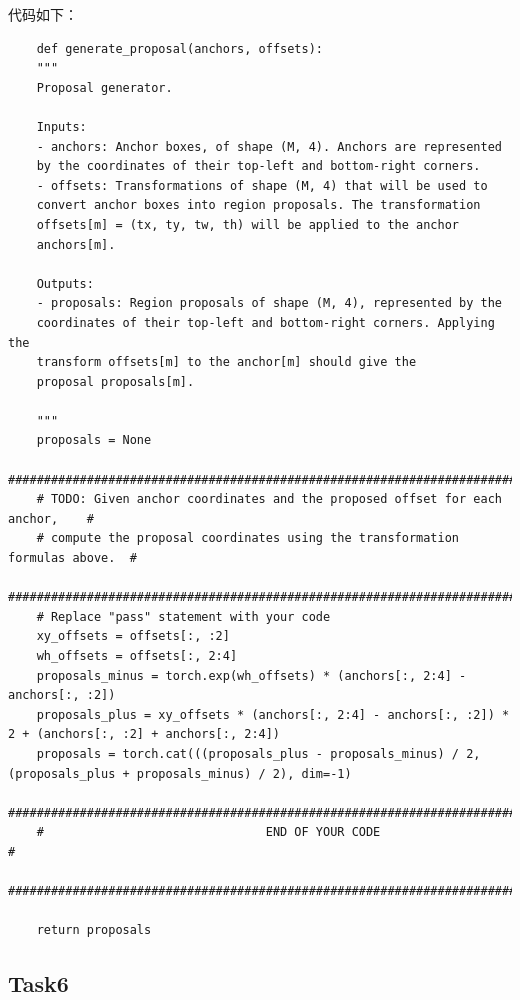 \documentclass{article}%
\begin{document}
代码如下：
\begin{lstlisting}
    def generate_proposal(anchors, offsets):
    """
    Proposal generator.

    Inputs:
    - anchors: Anchor boxes, of shape (M, 4). Anchors are represented
    by the coordinates of their top-left and bottom-right corners.
    - offsets: Transformations of shape (M, 4) that will be used to
    convert anchor boxes into region proposals. The transformation
    offsets[m] = (tx, ty, tw, th) will be applied to the anchor
    anchors[m].

    Outputs:
    - proposals: Region proposals of shape (M, 4), represented by the
    coordinates of their top-left and bottom-right corners. Applying the
    transform offsets[m] to the anchor[m] should give the
    proposal proposals[m].

    """
    proposals = None
    ##############################################################################
    # TODO: Given anchor coordinates and the proposed offset for each anchor,    #
    # compute the proposal coordinates using the transformation formulas above.  #
    ##############################################################################
    # Replace "pass" statement with your code
    xy_offsets = offsets[:, :2]
    wh_offsets = offsets[:, 2:4]
    proposals_minus = torch.exp(wh_offsets) * (anchors[:, 2:4] - anchors[:, :2])
    proposals_plus = xy_offsets * (anchors[:, 2:4] - anchors[:, :2]) * 2 + (anchors[:, :2] + anchors[:, 2:4])
    proposals = torch.cat(((proposals_plus - proposals_minus) / 2, (proposals_plus + proposals_minus) / 2), dim=-1)
    ##############################################################################
    #                               END OF YOUR CODE                             #
    ##############################################################################

    return proposals
\end{lstlisting}

\subsection{Task6}
\end{document}
